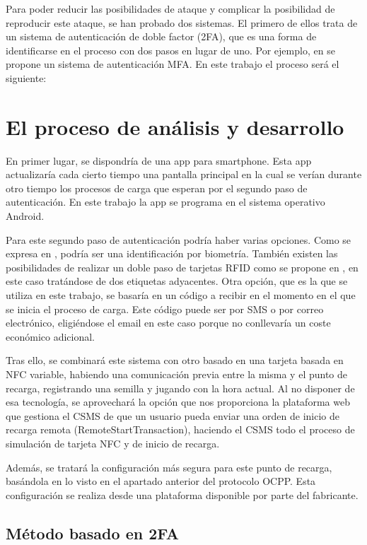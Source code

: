 \documentclass[12pt,a4paper,onecolumn,oneside]{report}
\begin{document}
Para poder reducir las posibilidades de ataque y complicar la posibilidad de reproducir este ataque, se han probado dos sistemas. 
El primero de ellos trata de un sistema de autenticación de doble factor (2FA), que es una forma de identificarse en el proceso con dos pasos en lugar de uno. Por ejemplo, en \cite{eados} se propone un sistema de autenticación MFA. En este trabajo el proceso será el siguiente:

\section{El proceso de análisis y desarrollo}

En primer lugar, se dispondría de una app para smartphone. Esta app actualizaría cada cierto tiempo una pantalla principal en la cual se verían durante otro tiempo los procesos de carga que esperan por el segundo paso de autenticación. En este trabajo la app se programa en el sistema operativo Android.

Para este segundo paso de autenticación podría haber varias opciones. Como se expresa en \cite{eatrece}, podría ser una identificación por biometría. También existen las posibilidades de realizar un doble paso de tarjetas RFID como se propone en \cite{eacinco}, en este caso tratándose de dos etiquetas adyacentes. Otra opción, que es la que se utiliza en este trabajo, se basaría en un código a recibir en el momento en el que se inicia el proceso de carga. Este código puede ser por SMS o por correo electrónico, eligiéndose el email en este caso porque no conllevaría un coste económico adicional.

Tras ello, se combinará este sistema con otro basado en una tarjeta basada en NFC variable, habiendo una comunicación previa entre la misma y el punto de recarga, registrando una semilla y jugando con la hora actual. Al no disponer de esa tecnología, se aprovechará la opción que nos proporciona la plataforma web que gestiona el CSMS de que un usuario pueda enviar una orden de inicio de recarga remota (RemoteStartTransaction), haciendo el CSMS todo el proceso de simulación de tarjeta NFC y de inicio de recarga.

Además, se tratará la configuración más segura para este punto de recarga, basándola en lo visto en el apartado anterior del protocolo OCPP. Esta configuración se realiza desde una plataforma disponible por parte del fabricante.

\subsection{Método basado en 2FA}
\end{document}
